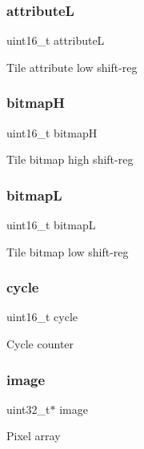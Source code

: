 \subsubsection{\texorpdfstring{attributeL}{attributeL}}
{\footnotesize\ttfamily uint16\+\_\+t attributeL}

Tile attribute low shift-\/reg \mbox{\label{struct_p_p_u_a0487b25ddf967f4aca280bca7c67336c}} 
\subsubsection{\texorpdfstring{bitmapH}{bitmapH}}
{\footnotesize\ttfamily uint16\+\_\+t bitmapH}

Tile bitmap high shift-\/reg \mbox{\label{struct_p_p_u_adc60b544127ab0cf3f48bec16b090fe0}} 
\subsubsection{\texorpdfstring{bitmapL}{bitmapL}}
{\footnotesize\ttfamily uint16\+\_\+t bitmapL}

Tile bitmap low shift-\/reg \mbox{\label{struct_p_p_u_a27eb4db4e065eac424e15c0c6569d1d7}} 
\subsubsection{\texorpdfstring{cycle}{cycle}}
{\footnotesize\ttfamily uint16\+\_\+t cycle}

Cycle counter \mbox{\label{struct_p_p_u_ac8986adb5b1723b0ee8c6d7b28ab921b}} 
\subsubsection{\texorpdfstring{image}{image}}
{\footnotesize\ttfamily uint32\+\_\+t$\ast$ image}

Pixel array \mbox{\label{struct_p_p_u_a2a9230344a369ccd1d395edd03dd6827}} 
